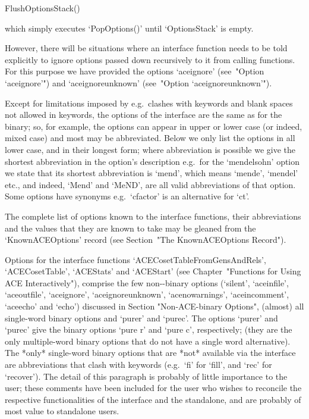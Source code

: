 \>FlushOptionsStack()

which simply executes `PopOptions()' until `OptionsStack' is empty.

However, there will be situations where an {\ACE}  interface  function
needs to be told explicitly to ignore options passed down  recursively
to it from calling functions. For this purpose we  have  provided  the
options `aceignore' (see~"Option `aceignore'") and  `aceignoreunknown'
(see~"Option `aceignoreunknown'").

\enditems


Except for limitations imposed by {\GAP}  e.g.\  clashes  with  {\GAP}
keywords and blank spaces not allowed in keywords, the options of  the
{\ACE} interface are the same as for the binary; so, for example,  the
options can appear in upper or lower case (or indeed, mixed case)  and
most may be abbreviated. Below we only list the options in  all  lower
case, and in their longest form; where  abbreviation  is  possible  we
give the shortest abbreviation in the  option's  description  e.g.~for
the `mendelsohn' option we state that  its  shortest  abbreviation  is
`mend', which means `mende', `mendel' etc.,  and  indeed,  `Mend'  and
`MeND', are all valid abbreviations of that option. Some options  have
synonyms e.g.~`cfactor' is an alternative for `ct'.

The complete list of {\ACE} options  known  to  the  {\ACE}  interface
functions, their abbreviations and the values that they are  known  to
take  may  be  gleaned  from   the   `KnownACEOptions'   record   (see
Section~"The KnownACEOptions Record").

Options      for      the       {\ACE}       interface       functions
`ACECosetTableFromGensAndRels',   `ACECosetTable',   `ACEStats'    and
`ACEStart' (see  Chapter~"Functions  for  Using  ACE  Interactively"),
comprise the few  non-{\ACE}-binary  options  (`silent',  `aceinfile',
`aceoutfile',   `aceignore',   `aceignoreunknown',    `acenowarnings',
`aceincomment',     `aceecho'     and     `echo')     discussed     in
Section "Non-ACE-binary  Options",  (almost)  all  single-word  {\ACE}
binary options and  `purer'  and  `purec'.  The  options  `purer'  and
`purec' give  the  {\ACE}  binary  options  `pure  r'  and  `pure  c',
respectively; (they are the only multiple-word {\ACE}  binary  options
that do not have a single word alternative).  The  *only*  single-word
{\ACE}  binary  options  that  are  *not*  available  via  the  {\ACE}
interface are abbreviations that clash with {\GAP} keywords (e.g.~`fi'
for `fill', and `rec' for `recover'). The detail of this paragraph  is
probably of little importance to the {\GAP} user; these comments  have
been included for the user who  wishes  to  reconcile  the  respective
functionalities of the {\ACE} interface and the {\ACE} standalone, and
are probably of most value to standalone users.

